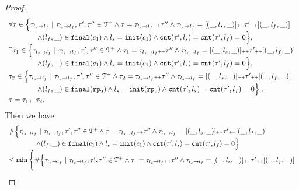 \begin{proof}
\[
  \begin{array}{l}
    \forall \mathtt{\tau} \in
    \Big\{\mathtt{\tau}_{l_s \to l_f} ~\vert~ \mathtt{\tau}_{l_s \to l_f}, \mathtt{\tau}', \mathtt{\tau}''\in \mathcal{T}^{+}
    \land \mathtt{\tau} = \mathtt{\tau}_{l_s \to l_f} {\scriptscriptstyle ++} \mathtt{\tau}''
    \land \mathtt{\tau}_{l_s \to l_f} = [(\_, l_s, \_)] {\scriptscriptstyle ++} \mathtt{\tau}' {\scriptscriptstyle ++} [(\_, l_f, \_)]
    \\ \qquad \qquad
    \land (l_{f}, \_) \in \mathtt{final}(c_1)
    \land l_s = \mathtt{init}(c_1)
    \land \mathtt{cnt}(\mathtt{\tau}', l_s) = \mathtt{cnt}(\mathtt{\tau}', l_f) = 0 
    \Big\},
    \\
    \exists \mathtt{\tau}_1 \in
    \Big\{\mathtt{\tau}_{l_s \to l_f} ~\vert~ \mathtt{\tau}_{l_s \to l_f}, \mathtt{\tau}', \mathtt{\tau}''\in \mathcal{T}^{+}
    \land \mathtt{\tau}_1 = \mathtt{\tau}_{l_s \to l_f} {\scriptscriptstyle ++} \mathtt{\tau}''
    \land \mathtt{\tau}_{l_s \to l_f} = [(\_, l_s, \_)] {\scriptscriptstyle ++} \mathtt{\tau}' {\scriptscriptstyle ++} [(\_, l_f, \_)]
    \\ \qquad \qquad
    \land (l_{f}, \_) \in \mathtt{final}(c_1)
    \land l_s = \mathtt{init}(c_1)
    \land \mathtt{cnt}(\mathtt{\tau}', l_s) = \mathtt{cnt}(\mathtt{\tau}', l_f) = 0 
    \Big\},
    \\
    \mathtt{\tau}_2 \in
    \Big\{\mathtt{\tau}_{l_s \to l_f} ~\vert~ \mathtt{\tau}_{l_s \to l_f}, \mathtt{\tau}', \mathtt{\tau}''\in \mathcal{T}^{+}
    \land \mathtt{\tau}_2 = \mathtt{\tau}_{l_s \to l_f} {\scriptscriptstyle ++} \mathtt{\tau}''
    \land \mathtt{\tau}_{l_s \to l_f} = [(\_, l_s, \_)] {\scriptscriptstyle ++} \mathtt{\tau}' {\scriptscriptstyle ++} [(\_, l_f, \_)]
   \\ \qquad \qquad
   \land (l_{f}, \_) \in \mathtt{final}(\mathtt{rp}_2)
   \land l_s = \mathtt{init}(\mathtt{rp}_2)
   \land \mathtt{cnt}(\mathtt{\tau}', l_s) = \mathtt{cnt}(\mathtt{\tau}', l_f) = 0 
   \Big\} 
   ~.~ 
   \\
   \mathtt{\tau} = \mathtt{\tau}_1 {\scriptscriptstyle ++} \mathtt{\tau}_2.
    \end{array}
  \]
  Then we have
  \[
    \begin{array}{l}
      \# \Big\{\mathtt{\tau}_{l_s \to l_f} ~\vert~ \mathtt{\tau}_{l_s \to l_f}, \mathtt{\tau}', \mathtt{\tau}''\in \mathcal{T}^{+}
      \land \mathtt{\tau} = \mathtt{\tau}_{l_s \to l_f} {\scriptscriptstyle ++} \mathtt{\tau}''
      \land \mathtt{\tau}_{l_s \to l_f} = [(\_, l_s, \_)] {\scriptscriptstyle ++} \mathtt{\tau}' {\scriptscriptstyle ++} [(\_, l_f, \_)]
      \\ \qquad \qquad
      \land (l_{f}, \_) \in \mathtt{final}(c_1)
      \land l_s = \mathtt{init}(c_1)
      \land \mathtt{cnt}(\mathtt{\tau}', l_s) = \mathtt{cnt}(\mathtt{\tau}', l_f) = 0 
      \Big\}
      \\ \leq 
      \min \Bigg\{ \#
      \Big\{\mathtt{\tau}_{l_s \to l_f} ~\vert~ \mathtt{\tau}_{l_s \to l_f}, \mathtt{\tau}', \mathtt{\tau}''\in \mathcal{T}^{+}
      \land \mathtt{\tau}_1 = \mathtt{\tau}_{l_s \to l_f} {\scriptscriptstyle ++} \mathtt{\tau}''
      \land \mathtt{\tau}_{l_s \to l_f} = [(\_, l_s, \_)] {\scriptscriptstyle ++} \mathtt{\tau}' {\scriptscriptstyle ++} [(\_, l_f, \_)]

\end{array}\]
\end{proof}
